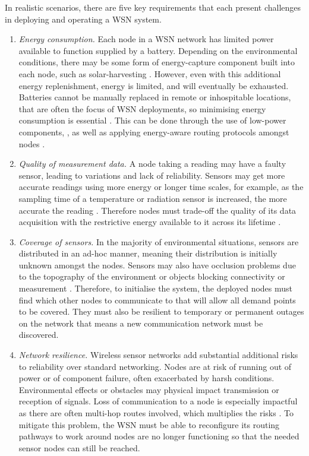In realistic scenarios, there are five key requirements that each present challenges in deploying and operating a WSN system.
\begin{enumerate}
\item \label{requirement:energy}\textit{Energy consumption.} Each node in a WSN network has limited power available to function supplied by a battery. Depending on the environmental conditions, there may be some form of energy-capture component built into each node, such as solar-harvesting \citep{Prauzek2018}. However, even with this additional energy replenishment, energy is limited, and will eventually be exhausted. Batteries cannot be manually replaced in remote or inhospitable locations, that are often the focus of WSN deployments, so minimising energy consumption is essential \citep{Anastasi2009}. This can be done through the use of low-power components, \citep{4772585, 8108667}, as well as applying energy-aware routing protocols amongst nodes \citep{s90100445}. 

\item \label{requirement:quality} \textit{Quality of measurement data.} A node taking a reading may have a faulty sensor, leading to variations and lack of reliability. Sensors may get more accurate readings using more energy or longer time scales, for example, as the sampling time of a temperature or radiation sensor is increased, the more accurate the reading \citep{s17061221}. Therefore nodes must trade-off the quality of its data acquisition with the restrictive energy available to it across its lifetime \citep{7845391}.

\item \label{requirement:coverage} \textit{Coverage of sensors.} In the majority of environmental situations, sensors are distributed in an ad-hoc manner, meaning their distribution is initially unknown amongst the nodes. Sensors may also have occlusion problems due to the topography of the environment or objects blocking connectivity or measurement \citep{10.1007/978-3-540-69170-9_23}. Therefore, to initialise the system, the deployed nodes must find which other nodes to communicate to that will allow all demand points to be covered. They must also be resilient to temporary or permanent outages on the network that means a new communication network must be discovered. 

\item \label{requirement:resilience} \textit{Network resilience.} Wireless sensor networks add substantial additional risks to reliability over standard networking. Nodes are at risk of running out of power or of component failure, often exacerbated by harsh conditions. Environmental effects or obstacles may physical impact transmission or reception of signals. Loss of communication to a node is especially impactful as there are often multi-hop routes involved, which multiplies the risks \citep{Paradis2007}. To mitigate this problem, the WSN must be able to reconfigure its routing pathways to work around nodes are no longer functioning so that the needed sensor nodes can still be reached.


\end{enumerate}
